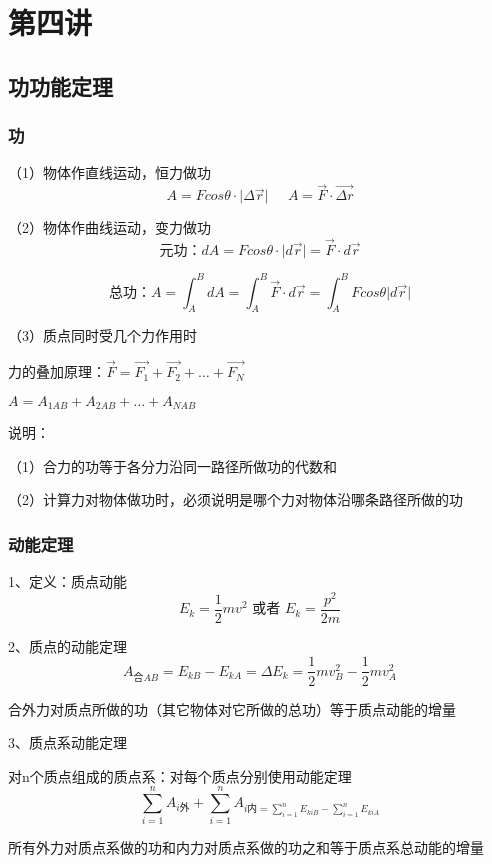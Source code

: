 \documentclass[UTF8]{article}
\begin{document}
\section{第四讲\;\;}
\subsection{功\;\;功能定理}
\subsubsection{功}

    （1）物体作直线运动，恒力做功
    \[A = Fcos\theta \cdot \lvert \Delta \vec{r} \vert\;\;\;\;\;A = \vec{F}\cdot\vec{\Delta r}\]

    （2）物体作曲线运动，变力做功
    \[\mbox{元功：}dA = Fcos\theta\cdot\lvert d\vec{r}\vert = \vec{F}\cdot d\vec{r}\]

    \[\mbox{总功：}A = \int_A^BdA = \int_A^B\vec{F}\cdot d\vec{r} = \int_A^BFcos\theta \lvert d\vec{r}\vert\]

    （3）质点同时受几个力作用时

    力的叠加原理：$\vec{F} = \vec{F_1} + \vec{F_2} + \dots + \vec{F_N}$

    \;\;\;\;\;\;\;\;\;\;\;\;\;\;\;\;\;\;\;\;$A = A_{1AB} + A_{2AB} + \dots + A_{NAB}$

    说明：

    \;\;（1）合力的功等于各分力沿同一路径所做功的代数和

    \;\;（2）计算力对物体做功时，必须说明是哪个力对物体沿哪条路径所做的功

\subsubsection{动能定理}

    1、定义：质点动能\[E_k = \frac{1}{2}mv^2\mbox{ 或者 }E_k = \frac{p^2}{2m}\]

    2、质点的动能定理\[A_{\mbox{合}AB} = E_{kB} - E_{kA} = \Delta E_k = \frac{1}{2}mv_B^2 - \frac{1}{2}mv_A^2\]

    \;\;合外力对质点所做的功（其它物体对它所做的总功）等于质点动能的增量

    3、质点系动能定理

    对n个质点组成的质点系：对每个质点分别使用动能定理
    \[\sum_{i=1}^n A_{i\mbox{外}} + \sum_{i=1}^n A_{i\mbox{内} = \sum_{i=1}^n E_{kiB} - \sum_{i=1}^n E_{kiA}}\]

    所有外力对质点系做的功和内力对质点系做的功之和等于质点系总动能的增量
\end{document}
